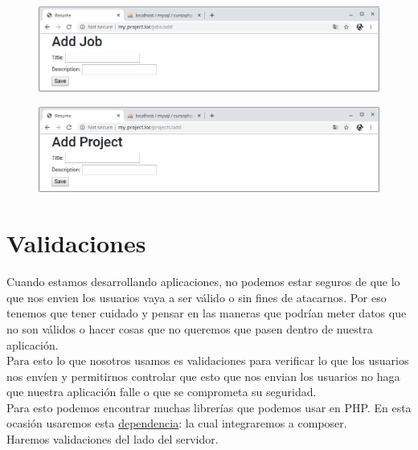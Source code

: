 \documentclass{article}
\begin{document}
\begin{figure}[h!]
  \centering
  \includegraphics[scale=0.5]{./Pictures/160_twig_addjob.png}
\end{figure}

\newpage

\begin{figure}[h!]
  \centering
  \includegraphics[scale=0.5]{./Pictures/161_twig_addproject.png}
\end{figure}

\newpage

\section{Validaciones}%
Cuando estamos desarrollando aplicaciones, no podemos estar seguros de que lo
que nos envien los usuarios vaya a ser válido o sin fines de atacarnos. Por eso
tenemos que tener cuidado y pensar en las maneras que podrían meter datos que
no son válidos o hacer cosas que no queremos que pasen dentro de nuestra
aplicación.\\

Para esto lo que nosotros usamos es validaciones para verificar lo que los
usuarios nos envíen y permitirnos controlar que esto que nos envian los
usuarios no haga que nuestra aplicación falle o que se comprometa su seguridad.\\

Para esto podemos encontrar muchas librerías que podemos usar en PHP. En esta
ocasión usaremos esta
\href{https://packagist.org/packages/respect/validation}{dependencia}: la cual
integraremos a composer.\\

Haremos validaciones del lado del servidor.\\
\end{document}
